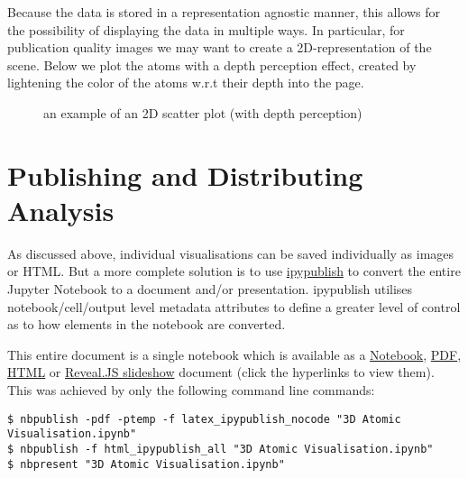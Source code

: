 \documentclass[10pt,parskip=half,
	toc=sectionentrywithdots,
	bibliography=totocnumbered,
	captions=tableheading,numbers=noendperiod]{scrartcl}
\begin{document}
Because the data is stored in a representation agnostic manner, this
allows for the possibility of displaying the data in multiple ways. In
particular, for publication quality images we may want to create a
2D-representation of the scene. Below we plot the atoms with a depth
perception effect, created by lightening the color of the atoms w.r.t
their depth into the page.

\begin{figure}[H]\begin{center}\end{center}\caption{an example of an 2D scatter plot (with depth perception)}\label{fig:mplplot1}
    \end{figure}

\section{Publishing and Distributing
Analysis}\label{publishing-and-distributing-analysis}

As discussed above, individual visualisations can be saved individually
as images or HTML. But a more complete solution is to use
\href{https://github.com/chrisjsewell/ipypublish}{ipypublish} to convert
the entire Jupyter Notebook to a document and/or presentation.
ipypublish utilises notebook/cell/output level metadata attributes to
define a greater level of control as to how elements in the notebook are
converted.

This entire document is a single notebook which is available as a
\href{https://github.com/chrisjsewell/chrisjsewell.github.io/blob/master/3d_atomic/3D\%20Atomic\%20Visualisation.ipynb}{Notebook},
\href{https://chrisjsewell.github.io/3d_atomic/converted/3D\%20Atomic\%20Visualisation.view_pdf.html}{PDF},
\href{https://chrisjsewell.github.io/3d_atomic/converted/3D\%20Atomic\%20Visualisation.html}{HTML}
or
\href{https://chrisjsewell.github.io/3d_atomic/converted/3D\%20Atomic\%20Visualisation.slides.html}{Reveal.JS
slideshow} document (click the hyperlinks to view them). This was
achieved by only the following command line commands:

\begin{verbatim}
$ nbpublish -pdf -ptemp -f latex_ipypublish_nocode "3D Atomic Visualisation.ipynb"
$ nbpublish -f html_ipypublish_all "3D Atomic Visualisation.ipynb"
$ nbpresent "3D Atomic Visualisation.ipynb"
\end{verbatim}
\end{document}
